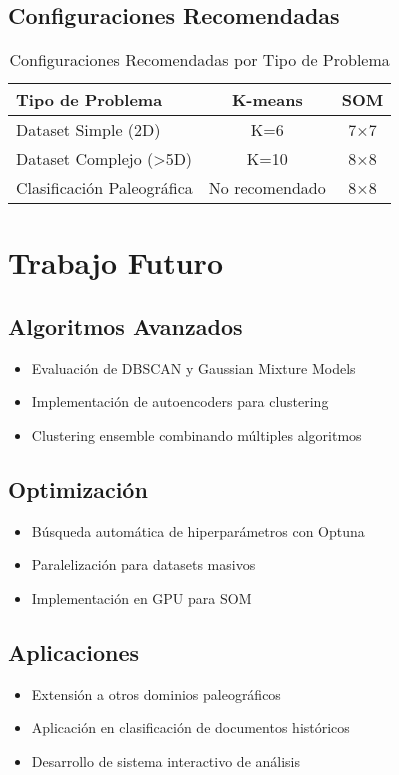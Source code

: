 \documentclass[12pt,a4paper]{article}
\begin{document}
\subsection{Configuraciones Recomendadas}

\begin{table}[H]
\centering
\caption{Configuraciones Recomendadas por Tipo de Problema}
\begin{tabular}{lcc}
\toprule
\textbf{Tipo de Problema} & \textbf{K-means} & \textbf{SOM} \\
\midrule
Dataset Simple (2D) & K=6 & 7×7 \\
Dataset Complejo (>5D) & K=10 & 8×8 \\
Clasificación Paleográfica & No recomendado & 8×8 \\
\bottomrule
\end{tabular}
\end{table}

\section{Trabajo Futuro}

\subsection{Algoritmos Avanzados}
\begin{itemize}
    \item Evaluación de DBSCAN y Gaussian Mixture Models
    \item Implementación de autoencoders para clustering
    \item Clustering ensemble combinando múltiples algoritmos
\end{itemize}

\subsection{Optimización}
\begin{itemize}
    \item Búsqueda automática de hiperparámetros con Optuna
    \item Paralelización para datasets masivos
    \item Implementación en GPU para SOM
\end{itemize}

\subsection{Aplicaciones}
\begin{itemize}
    \item Extensión a otros dominios paleográficos
    \item Aplicación en clasificación de documentos históricos
    \item Desarrollo de sistema interactivo de análisis
\end{itemize}
\end{document}
